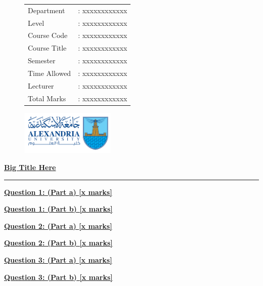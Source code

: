\documentclass[]{article}
\begin{document}
\begin{figure}
    \begin{minipage}{0.7\textwidth}
        \begin{tabular}{l l}
            Department   & : xxxxxxxxxxxx      \\
            Level        & : xxxxxxxxxxxx      \\
            Course Code  & : xxxxxxxxxxxx      \\
            Course Title & : xxxxxxxxxxxx      \\
            Semester     & : xxxxxxxxxxxx      \\
            Time Allowed & : xxxxxxxxxxxx      \\
            Lecturer     & : xxxxxxxxxxxx      \\
            Total Marks  & : xxxxxxxxxxxx      \\
        \end{tabular}
    \end{minipage}%
    \begin{minipage}{0.3\textwidth}
        \includegraphics[width=4.5cm]{collagelogo.png}
    \end{minipage}
\end{figure}
\vspace*{-1cm}
\begin{center}
    \textbf{\underline{\LARGE Big Title Here}}
\end{center}
\vspace*{.2cm}
\hrule
\textbf{\underline{Question 1: (Part a)  [x marks]}}
\begin{adjustwidth}{1cm}{2cm}
\end{adjustwidth}
\textbf{\underline{Question 1: (Part b)  [x marks]}}
\begin{adjustwidth}{1cm}{2cm}
\end{adjustwidth}
\textbf{\underline{Question 2: (Part a)  [x marks]}}
\begin{adjustwidth}{1cm}{2cm}
\end{adjustwidth}
\textbf{\underline{Question 2: (Part b)  [x marks]}}
\begin{adjustwidth}{1cm}{2cm}
\end{adjustwidth}
\textbf{\underline{Question 3: (Part a)  [x marks]}}
\begin{adjustwidth}{1cm}{2cm}
\end{adjustwidth}
\textbf{\underline{Question 3: (Part b)  [x marks]}}
\begin{adjustwidth}{1cm}{2cm}
\end{adjustwidth}
\end{document}
